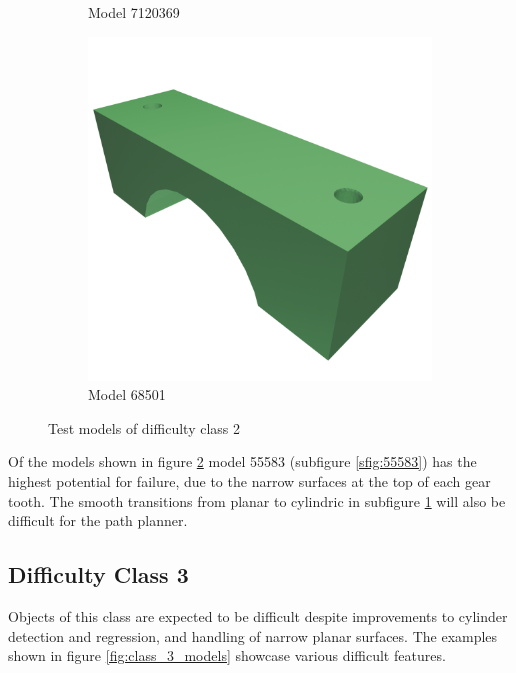 \begin{figure}[htb]
\begin{subfigure}{0.3\textwidth}
	\caption{Model 7120369}
	\label{sfig:7120369}
\end{subfigure}
\hfill
\begin{subfigure}{0.3\textwidth}
	\includegraphics[width=\textwidth]{../resources/models/68501.png}
	\caption{Model 68501}
\end{subfigure}
\caption{Test models of difficulty class 2}
\label{fig:class_2_models}
\end{figure}

Of the models shown in figure \ref{fig:class_2_models} model 55583 (subfigure \ref{sfig:55583}) has the highest potential for failure, due to the narrow surfaces at the top of each gear tooth.
The smooth transitions from planar to cylindric in subfigure \ref{sfig:7120369} will also be difficult for the path planner.

\subsection{Difficulty Class 3}
Objects of this class are expected to be difficult despite improvements to cylinder detection and regression, and handling of narrow planar surfaces.
The examples shown in figure \ref{fig:class_3_models} showcase various difficult features.

